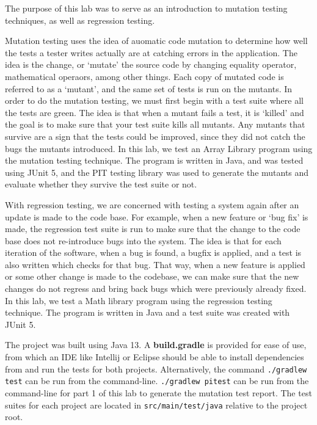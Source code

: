 The purpose of this lab was to serve as an introduction to mutation testing
techniques, as well as regression testing.

Mutation testing uses the idea of auomatic code mutation to determine how well
the tests a tester writes actually are at catching errors in the application.
The idea is the change, or `mutate' the source code by changing equality
operator, mathematical operaors, among other things. Each copy of mutated code
is referred to as a `mutant', and the same set of tests is run on the mutants.
In order to do the mutation testing, we must first begin with a test suite where
all the tests are green. The idea is that when a mutant fails a test, it is
`killed' and the goal is to make sure that your test suite kills all mutants.
Any mutants that survive are a sign that the tests could be improved, since they
did not catch the bugs the mutants introduced. In this lab, we test an Array
Library program using the mutation testing technique. The program is written in
Java, and was tested using JUnit 5, and the PIT testing library was used to
generate the mutants and evaluate whether they survive the test suite or not.

With regression testing, we are concerned with testing a system again after an
update is made to the code base. For example, when a new feature or `bug fix' is
made, the regression test suite is run to make sure that the change to the code
base does not re-introduce bugs into the system. The idea is that for each
iteration of the software, when a  bug is found, a bugfix is applied, and a test
is also written which checks for that bug. That way, when a new feature is
applied or some other change is made to the codebase, we can make sure that the
new changes do not regress and bring back bugs which were previously already
fixed. In this lab, we test a Math library program using the regression testing
technique. The program is written in Java and a test suite was created with
JUnit 5. 

The project was built using Java 13.
A \textbf{build.gradle} is provided for ease of use,
from which an IDE like Intellij or Eclipse should be able to install
dependencies from and run the tests for both projects. Alternatively, the
command
\texttt{./gradlew test} can be run from the command-line.
\texttt{./gradlew pitest} can be run from the command-line for part 1 of this
lab to generate the mutation test report. 
The test suites for each project are located in \texttt{src/main/test/java}
relative to the project root. 
